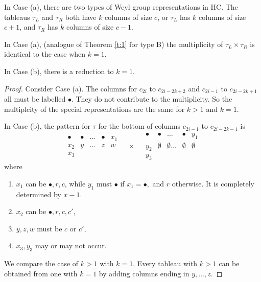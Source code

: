 \documentclass[11pt ,reqno]{amsart}
\begin{document}
\medskip
In Case (a),  there are two types of Weyl group representations in
HC. The tableaus $\tau_L$ and $\tau_R$ both have $k$ columns of size
$c$, or $\tau_L$ has $k$ columns of size $c+1$, and $\tau_R$ has
$k$ columns of size $c-1.$  
\begin{theorem}[Type C]\label{t:2}
In Case (a), (analogue of Theorem \ref{t:1} for type B) the multiplicity of $\tau_L\times\tau_R$ is identical to the case when
$k=1.$ 

\medskip
In Case (b), there is a reduction to $k=1$. 
\end{theorem}
\begin{proof}
Consider Case (a). The columns for $c_{2i}$ to $c_{2i-2k+2}$ and
$c_{2i-1}$ to $c_{2i-2k+1}$ all must be
labelled $\bullet.$ They do not contribute to the multiplicity. 
So the multiplcity of the special representations are the same for
$k>1$ and $k=1.$ 


In Case (b), the pattern for $\tau$ for the bottom of columns
$c_{2i-1}$ to $c_{2i-2k-1}$ is
$$
\begin{matrix}
\bullet&\bullet &  \dots &\bullet &x_1\\
x_2      &y       &  \dots &z       &w \\
x_3      &        &        &        &
\end{matrix}
\quad\times\quad
\begin{matrix}
\bullet&\bullet &  \dots &\bullet &y_1\\
y_2      &\emptyset      &\emptyset  \dots &\emptyset      &\emptyset \\  
y_3      &        &        &        &
\end{matrix}
$$
where 
\begin{enumerate}
\item $x_1$ can be $\bullet, r,c$, while $y_1$ must $\bullet$ if
  $x_1=\bullet,$ and $r$ otherwise. It is completely determined by
  $x-1.$ 
\item  $x_2$ can be $\bullet,r,c,c'$,
\item $y,z, w$ must be $c$ or $c',$
\item $x_3, y_3$ may or may not occur.
\end{enumerate}
We compare the case of $k>1$ with $k=1.$ Every tableau with $k>1$ can
be obtained from one with $k=1$ by adding columns ending in $y,\dots ,z.$
 

\end{proof}
\end{document}
